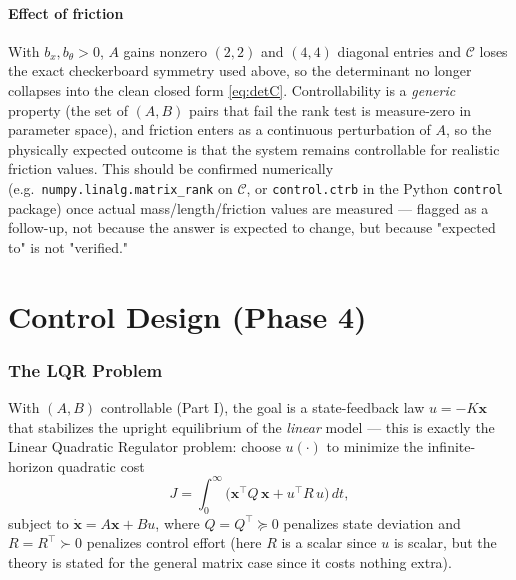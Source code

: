 \documentclass[11pt]{article}
\newcommand{\mb}[1]{\mathbf{#1}}
\begin{document}
\subsection{Effect of friction}
With $b_x,b_\theta>0$, $A$ gains nonzero $(2,2)$ and $(4,4)$ diagonal
entries and $\mathcal C$ loses the exact checkerboard symmetry used above,
so the determinant no longer collapses into the clean closed form
\eqref{eq:detC}. Controllability is a \emph{generic} property (the set of
$(A,B)$ pairs that fail the rank test is measure-zero in parameter space),
and friction enters as a continuous perturbation of $A$, so the physically
expected outcome is that the system remains controllable for realistic
friction values. This should be confirmed numerically (e.g.\
\texttt{numpy.linalg.matrix\_rank} on $\mathcal C$, or
\texttt{control.ctrb} in the Python \texttt{control} package) once actual
mass/length/friction values are measured — flagged as a follow-up, not
because the answer is expected to change, but because "expected to" is not
"verified."

\part{Control Design (Phase 4)}

\section{The LQR Problem}

With $(A,B)$ controllable (Part I), the goal is a state-feedback law
$u=-K\mb x$ that stabilizes the upright equilibrium of the \emph{linear}
model — this is exactly the Linear Quadratic Regulator problem: choose
$u(\cdot)$ to minimize the infinite-horizon quadratic cost
\begin{equation}
  J = \int_0^\infty \big(\mb x^\top Q\,\mb x + u^\top R\,u\big)\,dt,
  \label{eq:lqrcost}
\end{equation}
subject to $\dot{\mb x}=A\mb x+Bu$, where $Q=Q^\top\succeq0$ penalizes
state deviation and $R=R^\top\succ0$ penalizes control effort (here $R$ is
a scalar since $u$ is scalar, but the theory is stated for the general
matrix case since it costs nothing extra).
\end{document}
